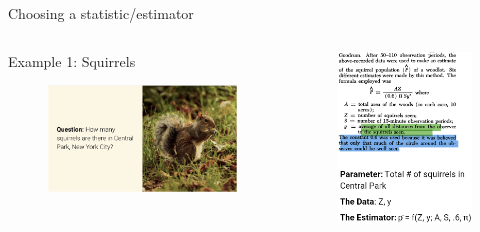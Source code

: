\documentclass[aspectratio=169]{../latex_main/tntbeamer}  %
\begin{document}
	
	\begin{frame}{Choosing a statistic/estimator}
	    \begin{columns}
	        \begin{column}{.4\textwidth}
	            Example 1: Squirrels\\
	           \begin{figure}
	               \includegraphics[scale=.6]{Bild25}
	               
	           \end{figure}
	        \end{column}
	        
	        \begin{column}{.5\textwidth}
	            \begin{figure}
                \includegraphics[scale=.33]{Bild26}
	                

\end{figure}
\end{column}
\end{columns}
\end{frame}
\end{document}
